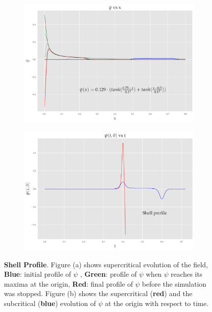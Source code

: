 \begin{figure}
    \centering
    \begin{subfigure}[b]{0.85\textwidth}
        \includegraphics[width=1\linewidth]{images/super_shell.pdf}
        \caption{}
        \label{fig:shell}
    \end{subfigure}

    \begin{subfigure}[b]{0.85\textwidth}
        \includegraphics[width=1\linewidth]{images/at0_shell.pdf}
        \caption{}
        \label{fig:at0_shell}
    \end{subfigure}
    \caption[shell profile field evolution]{\textbf{Shell Profile}. Figure (a) shows supercritical evolution of the field, \textbf{Blue}: initial profile of $\psi$ , \textbf{Green}: profile of $\psi$ when $\psi$ reaches its maxima at the origin, \textbf{Red}: final profile of $\psi$ before the simulation was stopped. Figure (b) shows the supercritical (\textbf{red}) and the subcritical (\textbf{blue}) evolution of $\psi$ at the origin with respect to time.}
\end{figure}
